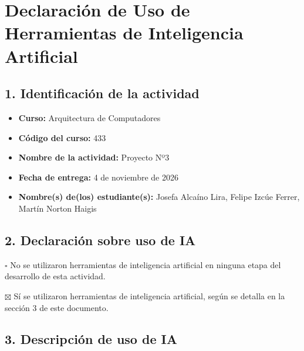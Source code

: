 \documentclass[11pt,letterpaper]{article}
\begin{document}
\newpage
\section*{Declaración de Uso de Herramientas de Inteligencia Artificial}

\subsection*{1. Identificación de la actividad}
\begin{itemize}
  \item \textbf{Curso:} Arquitectura de Computadores
  \item \textbf{Código del curso:} 433
  \item \textbf{Nombre de la actividad:} Proyecto Nº3
  \item \textbf{Fecha de entrega:} 4 de noviembre de 2026
  \item \textbf{Nombre(s) de(los) estudiante(s):} Josefa Alcaíno Lira, Felipe Izcúe Ferrer, Martín Norton Haigis
\end{itemize}

\subsection*{2. Declaración sobre uso de IA} \noindent $\square$ No se utilizaron herramientas de inteligencia artificial en ninguna etapa del desarrollo de esta actividad.

\noindent $\boxtimes$ Sí se utilizaron herramientas de inteligencia artificial, según se detalla en la sección 3 de este documento.

\subsection*{3. Descripción de uso de IA}
\end{document}
